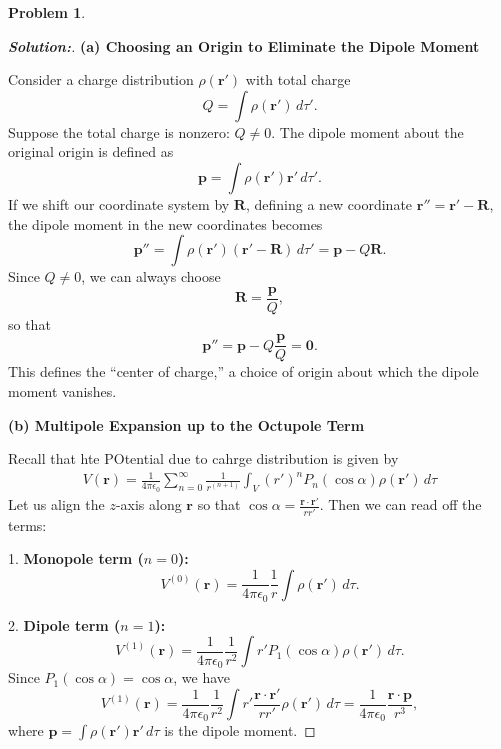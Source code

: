 \documentclass[12pt]{article}
\theoremstyle{definition}\newtheorem{problem}{Problem}
\newenvironment{solution}{\begin{proof}[\bfseries\textup{Solution:}]}{\end{proof}}
\begin{document}
\newpage
\begin{problem}
\end{problem}
\begin{solution}

    \noindent\textbf{(a) Choosing an Origin to Eliminate the Dipole Moment}

    Consider a charge distribution $\rho(\mathbf{r}')$ with total charge 
    \[
    Q = \int \rho(\mathbf{r}') \, d\tau'.
    \] 
    Suppose the total charge is nonzero: $Q \neq 0$. The dipole moment about the original origin is defined as
    \[
    \mathbf{p} = \int \rho(\mathbf{r}') \mathbf{r}' \, d\tau'.
    \]
    If we shift our coordinate system by $\mathbf{R}$, defining a new coordinate $\mathbf{r}'' = \mathbf{r}' - \mathbf{R}$, the dipole moment in the new coordinates becomes
    \[
    \mathbf{p}'' = \int \rho(\mathbf{r}')(\mathbf{r}' - \mathbf{R}) \, d\tau' 
    = \mathbf{p} - Q \mathbf{R}.
    \]
    Since $Q \neq 0$, we can always choose 
    \[
    \mathbf{R} = \frac{\mathbf{p}}{Q},
    \]
    so that 
    \[
    \mathbf{p}'' = \mathbf{p} - Q \frac{\mathbf{p}}{Q} = \mathbf{0}.
    \]
    This defines the ``center of charge,'' a choice of origin about which the dipole moment vanishes.
    
    \medskip
    
    \noindent\textbf{(b) Multipole Expansion up to the Octupole Term}
    
    Recall that hte POtential due to cahrge distribution is given by  
    \begin{align} 
        V(\mathbf{r}) = \frac{1}{4 \pi \epsilon_{0}}  \sum_{n = 0}^{\infty} \frac{1}{r^{(n+1)} }\int_{V} (r')^{n} P_n(\cos \alpha) \rho(\mathbf{r'} )  \, d\tau 
    \end{align}
    Let us align the $z$-axis along $\mathbf{r}$ so that $\cos\alpha = \frac{\mathbf{r}\cdot \mathbf{r}'}{r r'}$.
    Then we can read off the terms:
    
    1. \textbf{Monopole term ($n=0$):}
    \[
    V^{(0)}(\mathbf{r}) = \frac{1}{4\pi \epsilon_0} \frac{1}{r} \int \rho(\mathbf{r}')\,d\tau.
    \]
    
    2. \textbf{Dipole term ($n=1$):}
    \[
    V^{(1)}(\mathbf{r}) = \frac{1}{4\pi \epsilon_0}\frac{1}{r^2}\int r' P_1(\cos\alpha)\rho(\mathbf{r}')\,d\tau.
    \]
    Since $P_1(\cos\alpha) = \cos\alpha$, we have
    \[
    V^{(1)}(\mathbf{r}) = \frac{1}{4\pi \epsilon_0}\frac{1}{r^2}\int r' \frac{\mathbf{r}\cdot\mathbf{r}'}{r r'}\rho(\mathbf{r}')\,d\tau = \frac{1}{4\pi \epsilon_0}\frac{\mathbf{r}\cdot\mathbf{p}}{r^3},
    \]
    where $\mathbf{p} = \int \rho(\mathbf{r}')\mathbf{r}'\,d\tau$ is the dipole moment.
    

\end{solution}
\end{document}
